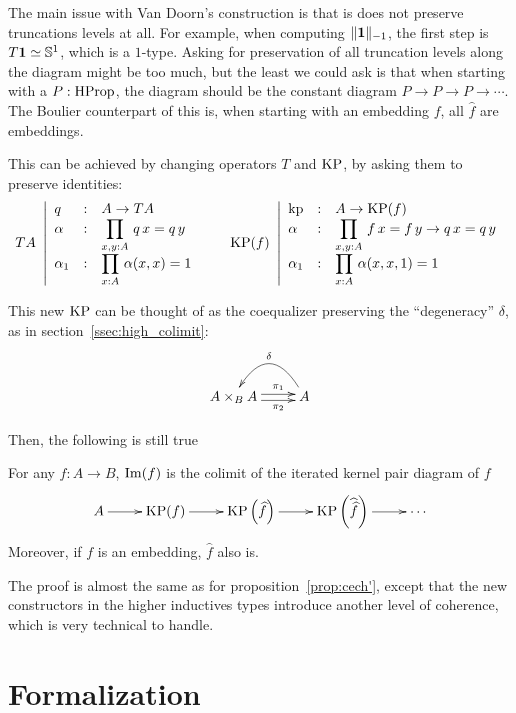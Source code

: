 The main issue with Van Doorn's construction is
that is does not preserve truncations levels at all. For example, when
computing $\|\mathbf{1}\|_{-1}$, the first step is $T\mathbf{1} \simeq \mathbb{S}^1$,
which is a $1$-type. 
Asking for preservation of all truncation levels along the diagram
might be too much, but the least we could ask is that when starting
with a $P:\operatorname{HProp}$, the diagram should be the constant diagram $P\to
P \to P\to \cdots$. The Boulier counterpart of this is, when starting
with an embedding $f$, all $\widehat f$ are embeddings. 

This can be achieved by changing operators $T$ and $\operatorname{KP}$, by asking
them to preserve identities:
\[
  TA~\left|
    \begin{array}{lll}
      q&:& A\to TA \\
      \alpha&:& \displaystyle{\prod_{x,y:A}\, q\, x = q\, y} \\
      \alpha_1&:& \displaystyle{\prod_{x:A}\, \alpha(x,x) = 1}
    \end{array}
  \right.
  \quad \quad
  \operatorname{KP}(f)~\left|
    \begin{array}{lll}
      \operatorname{kp}&:&A\to \operatorname{KP}(f) \\
      \alpha&:& \displaystyle{\prod_{x,y:A}\, f\, x = f\, y \to q\, x = q\, y} \\
      \alpha_1&:& \displaystyle{\prod_{x:A}\, \alpha(x,x,1) = 1}
    \end{array}    
  \right.
\]

This new $\operatorname{KP}$ can be thought of as the coequalizer preserving the
``degeneracy'' $\delta$, as in section~\ref{ssec:high_colimit}:
\[ 
  \xymatrix{
    A\times_B A \ar@<-.5ex>[r]_-{\pi_2}
    \ar@<.5ex>[r]^-{\pi_1} & A \ar@/_2pc/[l]_\delta
  }
\]

Then, the following is still true

\begin{prop}\label{prop:cech}
  For any $f:A\to B$, $\operatorname{Im}(f)$ is the colimit of the iterated kernel
  pair diagram of $f$
\[\xymatrix{
  A \ar[r] & \KP(f) \ar[r] & \KP\left(\widehat f\right) \ar[r]& \KP\left(\widehat{\widehat f}\right) \ar[r]& \cdots
}\]
Moreover, if $f$ is an embedding, $\widehat f$ also is.
\end{prop}
The proof is almost the same as for proposition~\ref{prop:cech'},
except that the new constructors in the higher inductives types
introduce another level of coherence, which is very technical to
handle.

\section{Formalization}
\label{sec:colim-formalization}

